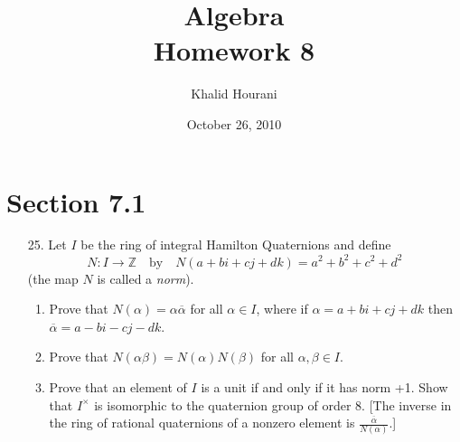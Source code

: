 \documentclass[12pt,leqno]{book}
\title{Algebra\\\large Homework 8}
\date{October 26, 2010}
\author{Khalid Hourani}
\theoremstyle{definition}
\newcommand{\Z}{\mathbb{Z}}
\begin{document}
 \begin{titlepage}
  \maketitle
 \end{titlepage}

\section*{Section 7.1}
\begin{enumerate}
 \item [25.] Let $I$ be the ring of integral Hamilton Quaternions and define \[N:I\to\Z\:\:\:\text{ by }\:\:\:N(a+bi+cj+dk)=a^2+b^2+c^2+d^2\] (the map $N$ is called a \textit{norm}).
  \begin{enumerate}
   \item Prove that $N(\alpha)=\alpha\overline{\alpha}$ for all $\alpha\in I$, where if $\alpha=a+bi+cj+dk$ then $\overline{\alpha}=a-bi-cj-dk$.
   \item Prove that $N(\alpha\beta)=N(\alpha)N(\beta)$ for all $\alpha,\beta\in I$.
   \item Prove that an element of $I$ is a unit if and only if it has norm +1. Show that $I^{\times}$ is isomorphic to the quaternion group of order 8. [The inverse in the ring of rational quaternions of a nonzero element is $\displaystyle\frac{\overline{\alpha}}{N(\alpha)}$.]
  \end{enumerate}


\end{enumerate}
\end{document}
